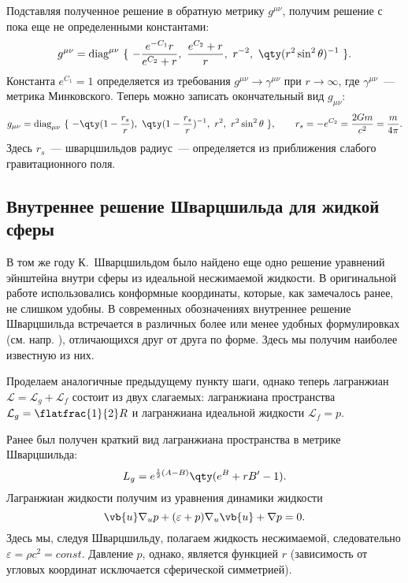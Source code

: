 \documentclass[\docroot/reports/draft/report.tex]{subfiles}
\begin{document}
    Подставляя полученное решение в обратную метрику $g^{\mu\nu}$, получим решение с пока еще не определенными константами:
    \begin{equation*}
        g^{\mu\nu} = \text{diag}^{\mu\nu}\ \{\
            -\frac{e^{-C_1} r}{e^{C_2} + r},\
            \frac{e^{C_2} + r}{r},\
            r^{-2},\
            \qty(r^2 \sin^2\theta)^{-1}
        \ \} .
    \end{equation*}
    Константа $e^{C_1} = 1$ определяется из требования $g^{\mu\nu} \to \gamma^{\mu\nu}$ при $r \to \infty$, где $\gamma^{\mu\nu}$~--- метрика Минковского. Теперь можно записать окончательный вид $g_{\mu\nu}$:
    \begin{equation*}
        g_{\mu\nu} = \text{diag}_{\mu\nu}\ \{\
            - \qty(1 - \frac{r_s}{r}),\
            \qty(1 - \frac{r_s}{r})^{-1},\
            r^2,\
            r^2 \sin^2\theta
        \ \} , \qquad r_s = - e^{C_2} = \frac{2 G m}{c^2} = \frac{m}{4 \pi} .
    \end{equation*}
    Здесь $r_s$~--- шварцшильдов радиус~--- определяется из приближения слабого гравитационного поля.

\subsection{Внутреннее решение Шварцшильда для жидкой сферы}

    В том же году К.~Шварцшильдом \cite{schwarzschild_fluid} было найдено еще одно решение уравнений эйнштейна внутри сферы из идеальной несжимаемой жидкости. В оригинальной работе использовались конформные координаты, которые, как замечалось ранее, не слишком удобны. В современных обозначениях внутреннее решение Шварцшильда встречается в различных более или менее удобных формулировках (см. напр. \cite{delgaty_lake_solution_list,cambridge_exact_solutions,boonserm_exact_solutions}), отличающихся друг от друга по форме. Здесь мы получим наиболее известную из них.

    Проделаем аналогичные предыдущему пункту шаги, однако теперь лагранжиан $\mathcal{L} = \mathcal{L}_g + \mathcal{L}_f$ состоит из двух слагаемых: лагранжиана пространства $\mathcal{L}_g = \flatfrac{1}{2} R$ и лагранжиана идеальной жидкости $\mathcal{L}_f = p$.

    Ранее был получен краткий вид лагранжиана пространства в метрике Шварцшильда:
    \begin{equation*}
        L_g = e^{\frac{1}{2} (A - B)} \qty(e^B + r B' - 1) .
    \end{equation*}
    Лагранжиан жидкости получим из уравнения динамики жидкости
    \begin{equation*}
        \vb{u} \nabla_u p + (\varepsilon + p) \nabla_u \vb{u} + \nabla p = 0 .
    \end{equation*}
    Здесь мы, следуя Шварцшильду, полагаем жидкость несжимаемой, следовательно $\varepsilon = \rho c^2 = const$. Давление $p$, однако, является функцией $r$ (зависимость от угловых координат исключается сферической симметрией).
\end{document}
